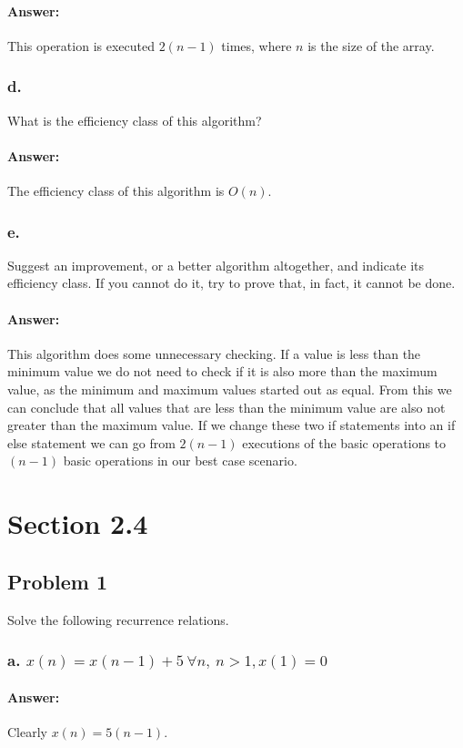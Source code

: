 \documentclass{article}
\begin{document}
      \paragraph{Answer:}
      This operation is executed $2(n-1)$ times, where $n$ is the size of the array.
    \subsubsection{d.}
      What is the efficiency class of this algorithm?
      \paragraph{Answer:}
      The efficiency class of this algorithm is $O(n)$.
    \subsubsection{e. }
    Suggest an improvement, or a better algorithm altogether, and indicate its
      efficiency class. If you cannot do it, try to prove that, in fact, it cannot be
      done.
    \paragraph{Answer:}
    This algorithm does some unnecessary checking. If a value is less than the minimum value we do not need to check if it is also
    more than the maximum value, as the minimum and maximum values started out as equal. From this we can conclude that all values that are less than the minimum value are also not greater than the
    maximum value. If we change these two if statements into an if else statement we can go from $2(n-1)$ executions of the basic operations to $(n-1)$ basic operations in our best case scenario.
\section{Section 2.4}
  \subsection{Problem 1}
    Solve the following recurrence relations.
    \subsubsection{a. $x(n) = x(n-1) + 5 \ \forall{n}, \ n > 1, x(1) = 0$}
      \paragraph{Answer:}
        Clearly $x(n) = 5(n-1)$.
\end{document}
